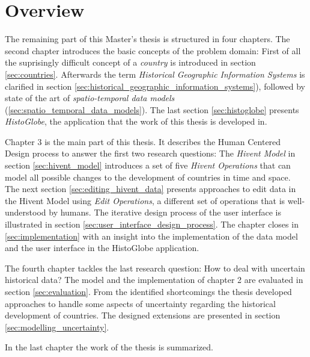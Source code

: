 \newpage
\section{Overview} %
\label{sec:overview}

The remaining part of this Master's thesis is structured in four chapters. The second chapter introduces the basic concepts of the problem domain: First of all the suprisingly difficult concept of a \emph{country} is introduced in section \ref{sec:countries}. Afterwards the term \emph{Historical Geographic Information Systems} is clarified in section \ref{sec:historical_geographic_information_systems}), followed by state of the art of \emph{spatio-temporal data models} (\ref{sec:spatio_temporal_data_models}). The last section \ref{sec:histoglobe} presents \emph{HistoGlobe}, the application that the work of this thesis is developed in.

Chapter 3 is the main part of this thesis. It describes the Human Centered Design process to answer the first two research questions: The \emph{Hivent Model} in section \ref{sec:hivent_model} introduces a set of five \emph{Hivent Operations} that can model all possible changes to the development of countries in time and space. The next section \ref{sec:editing_hivent_data} presents approaches to edit data in the Hivent Model using \emph{Edit Operations}, a different set of operations that is well-understood by humans. The iterative design process of the user interface is illustrated in section \ref{sec:user_interface_design_process}. The chapter closes in \ref{sec:implementation} with an insight into the implementation of the data model and the user interface in the HistoGlobe application.

The fourth chapter tackles the last research question: How to deal with uncertain historical data? The model and the implementation of chapter 2 are evaluated in section \ref{sec:evaluation}. From the identified shortcomings the thesis developed approaches to handle some aspects of uncertainty regarding the historical development of countries. The designed extensions are presented in section \ref{sec:modelling_uncertainty}.

In the last chapter the work of the thesis is summarized.




